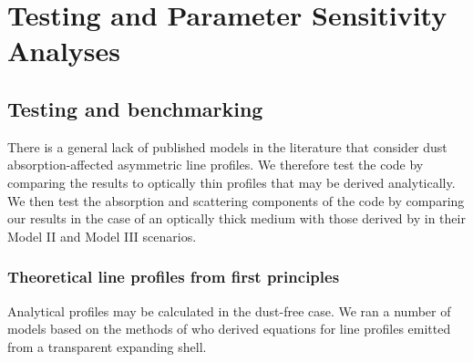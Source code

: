 

%
%
\chapter{Testing and Parameter Sensitivity Analyses}\label{chp:chp4}

\section{Testing and benchmarking}
There is a general lack of published models in the literature that 
consider dust absorption-affected asymmetric line profiles.  We therefore test 
the code by comparing the results to optically thin profiles that may be 
derived analytically.  We then test the absorption and scattering 
components of the code by comparing our results in the case of an 
optically thick medium with those derived by \citet{Lucy1989} in their 
Model II and Model III scenarios.

\subsection{Theoretical line profiles from first principles}
\label{analytics}

Analytical profiles may be calculated in the dust-free case.  We ran a 
number of models based on the methods of \cite{Gerasimovic1933} 
who derived equations for line profiles emitted from a transparent 
expanding shell.

